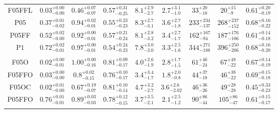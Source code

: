 \documentclass[submission,phys]{lib/SciPost}
\begin{document}
\begin{table}
\begin{tabular}{c c c c c c c c c}
           F05FFL  & $0.03^{+0.00}_{-0.00}$ & $0.46^{+0.07}_{-0.07}$ & $0.57^{+0.31}_{-0.25}$ & $8.1^{+2.9}_{-2.7}$ & $2.7^{+3.1}_{-1.0}$ & $33^{+20}_{-18}$ & $20^{+15}_{-9}$ & $0.61^{+0.20}_{-0.19}$ \vspace{0.25em}\\
           P05     & $0.37^{+0.01}_{-0.02}$ & $0.94^{+0.02}_{-0.01}$ & $0.55^{+0.23}_{-0.23}$ & $8.3^{+2.7}_{-3.1}$ & $3.6^{+2.7}_{-1.8}$ & $233^{+234}_{-137}$ & $268^{+237}_{-152}$ & $0.68^{+0.16}_{-0.22}$ \vspace{0.25em}\\
           P05FF   & $0.52^{+0.02}_{-0.00}$ & $0.92^{+0.00}_{-0.01}$ & $0.57^{+0.21}_{-0.24}$ & $8.1^{+2.8}_{-3.2}$ & $3.4^{+2.7}_{-1.7}$ & $162^{+167}_{-94}$ & $187^{+176}_{-106}$ & $0.61^{+0.14}_{-0.18}$ \vspace{0.25em}\\
           P1      & $0.72^{+0.02}_{-0.01}$ & $0.97^{+0.00}_{-0.01}$ & $0.54^{+0.24}_{-0.23}$ & $7.8^{+3.0}_{-3.0}$ & $3.3^{+2.5}_{-1.6}$ & $344^{+271}_{-188}$ & $396^{+250}_{-206}$ & $0.68^{+0.16}_{-0.20}$ \vspace{0.25em}\\
           \hline \vspace{-0.75em}\\
           F05O    & $0.02^{+0.00}_{-0.01}$ & $1.00^{+0.00}_{-0.16}$ & $0.81^{+0.09}_{-0.17}$ & $4.0^{+2.6}_{-1.9}$ & $2.8^{+1.7}_{-1.5}$ & $61^{+46}_{-24}$ & $67^{+48}_{-22}$ & $0.67^{+0.14}_{-0.19}$ \vspace{0.25em}\\
           F05FFO  & $0.03^{+0.00}_{-0.00}$ & $0.8^{+0.02}_{-0.15}$ & $0.76^{+0.10}_{-0.17}$ & $3.4^{+3.4}_{-1.7}$ & $1.8^{+2.0}_{-0.8}$ & $44^{+37}_{-18}$ & $46^{+38}_{-22}$ & $0.69^{+0.15}_{-0.18}$ \vspace{0.25em}\\
           F05OC   & $0.02^{+0.01}_{-0.00}$ & $0.67^{+0.19}_{-0.07}$ & $0.81^{+0.10}_{-0.14}$ & $4.7^{+3.2}_{-2.7}$ & $3.6^{+2.6}_{-2.02}$ & $46^{+36}_{-26}$ & $49^{+28}_{-28}$ & $0.45^{+0.33}_{-0.23}$ \vspace{0.25em}\\
           P05FFO  & $0.76^{+0.01}_{-0.01}$ & $0.89^{+0.03}_{-0.03}$ & $0.78^{+0.12}_{-0.15}$ & $3.7^{+3.5}_{-2.1}$ & $2.1^{+2.5}_{-1.2}$ & $90^{+86}_{-44}$ & $105^{+86}_{-47}$ & $0.61^{+0.15}_{-0.17}$ \vspace{0.25em}\\
           \hline
         \hline                                   %
         \label{Tab:Final_ISF_FFC_Results}
        \end{tabular}
     \end{table}
\end{document}
